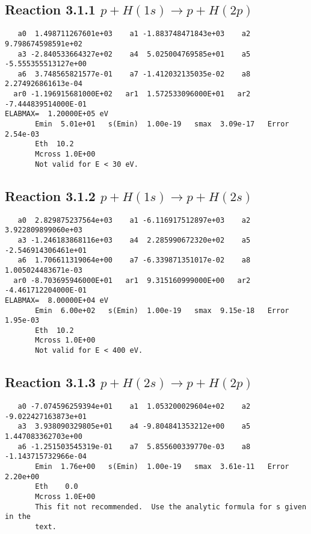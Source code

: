 \documentclass[12pt,dvipdfm]{article}
\begin{document}
\newpage
\subsection{
Reaction 3.1.1 $   p + H(1s) \rightarrow p + H(2p)$}


\begin{small}\begin{verbatim}
   a0  1.498711267601e+03    a1 -1.883748471843e+03    a2  9.798674598591e+02
   a3 -2.840533664327e+02    a4  5.025004769585e+01    a5 -5.555355513127e+00
   a6  3.748565821577e-01    a7 -1.412032135035e-02    a8  2.274926861613e-04
  ar0 -1.196915681000E+02   ar1  1.572533096000E+01   ar2 -7.444839514000E-01
ELABMAX=  1.20000E+05 eV
       Emin  5.01e+01   s(Emin)  1.00e-19   smax  3.09e-17   Error  2.54e-03
       Eth  10.2
       Mcross 1.0E+00
       Not valid for E < 30 eV.
\end{verbatim}\end{small}


\newpage
\subsection{
Reaction 3.1.2 $   p + H(1s) \rightarrow p + H(2s)$}


\begin{small}\begin{verbatim}
   a0  2.829875237564e+03    a1 -6.116917512897e+03    a2  3.922809899060e+03
   a3 -1.246183868116e+03    a4  2.285990672320e+02    a5 -2.546914306461e+01
   a6  1.706611319064e+00    a7 -6.339871351017e-02    a8  1.005024483671e-03
  ar0 -8.703695946000E+01   ar1  9.315160999000E+00   ar2 -4.461712204000E-01
ELABMAX=  8.00000E+04 eV
       Emin  6.00e+02   s(Emin)  1.00e-19   smax  9.15e-18   Error  1.95e-03
       Eth  10.2
       Mcross 1.0E+00
       Not valid for E < 400 eV.
\end{verbatim}\end{small}

\newpage
\subsection{
Reaction 3.1.3 $   p + H(2s) \rightarrow p + H(2p)$}


\begin{small}\begin{verbatim}
   a0 -7.074596259394e+01    a1  1.053200029604e+02    a2 -9.022427163873e+01
   a3  3.938090329805e+01    a4 -9.804841353212e+00    a5  1.447083362703e+00
   a6 -1.251503545319e-01    a7  5.855600339770e-03    a8 -1.143715732966e-04
       Emin  1.76e+00   s(Emin)  1.00e-19   smax  3.61e-11   Error  2.20e+00
       Eth    0.0
       Mcross 1.0E+00
       This fit not recommended.  Use the analytic formula for s given in the
       text.
\end{verbatim}\end{small}
\end{document}

